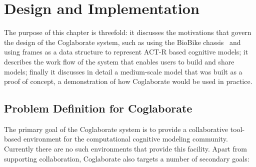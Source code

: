 \chapter{Design and Implementation}
\label{chap-five}



The purpose of this chapter is threefold: it discusses the motivations
that govern the design of the Coglaborate system, such as using the
BioBike chassis~\cite{journals/bioinformatics/MassarTES05} and using
frames as a data structure to represent ACT-R based cognitive models;
it describes the work flow of the system that enables users to build
and share models; finally it discusses in detail a medium-scale model
that was built as a proof of concept, a demonstration of how
Coglaborate would be used in practice.

\section{Problem Definition for Coglaborate}


The primary goal of the Coglaborate system is to provide a
collaborative tool-based environment for the computational cognitive
modeling community. Currently there are no such environments that
provide this facility. Apart from supporting collaboration,
Coglaborate also targets a number of secondary goals:

